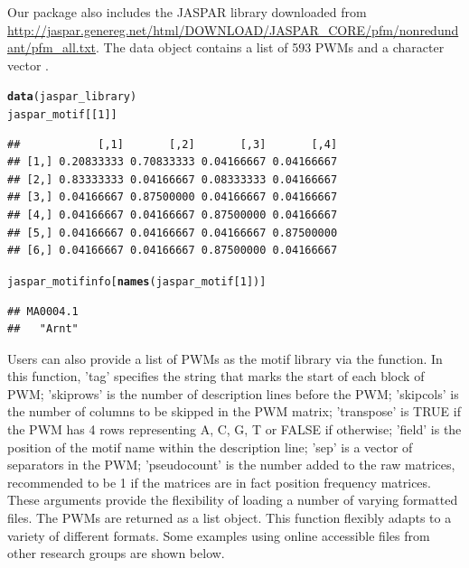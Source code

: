 \documentclass[a4paper,10pt]{article}\usepackage[]{graphicx}\usepackage[]{color}
\makeatletter
\newcommand{\hlnum}[1]{\textcolor[rgb]{0.686,0.059,0.569}{#1}}%
\newcommand{\hlstd}[1]{\textcolor[rgb]{0.345,0.345,0.345}{#1}}%
\newcommand{\hlkwd}[1]{\textcolor[rgb]{0.737,0.353,0.396}{\textbf{#1}}}%
\newenvironment{kframe}{%
 \def\at@end@of@kframe{}%
 \ifinner\ifhmode%
  \def\at@end@of@kframe{\end{minipage}}%
  \begin{minipage}{\columnwidth}%
 \fi\fi%
 \def\FrameCommand##1{\hskip\@totalleftmargin \hskip-\fboxsep
 \colorbox{shadecolor}{##1}\hskip-\fboxsep
     \hskip-\linewidth \hskip-\@totalleftmargin \hskip\columnwidth}%
 \MakeFramed {\advance\hsize-\width
   \@totalleftmargin\z@ \linewidth\hsize
   \@setminipage}}%
 {\par\unskip\endMakeFramed%
 \at@end@of@kframe}
\newenvironment{knitrout}{}{} %
\makeatother
\begin{document}
Our package also includes the JASPAR library downloaded from \url{http://jaspar.genereg.net/html/DOWNLOAD/JASPAR_CORE/pfm/nonredundant/pfm_all.txt}. The data object  contains a list of 593 PWMs  and a character vector .

\begin{knitrout}
\color{fgcolor}\begin{kframe}
\begin{alltt}
\hlkwd{data}\hlstd{(jaspar_library)}
\hlstd{jaspar_motif[[}\hlnum{1}\hlstd{]]}
\end{alltt}
\begin{verbatim}
##            [,1]       [,2]       [,3]       [,4]
## [1,] 0.20833333 0.70833333 0.04166667 0.04166667
## [2,] 0.83333333 0.04166667 0.08333333 0.04166667
## [3,] 0.04166667 0.87500000 0.04166667 0.04166667
## [4,] 0.04166667 0.04166667 0.87500000 0.04166667
## [5,] 0.04166667 0.04166667 0.04166667 0.87500000
## [6,] 0.04166667 0.04166667 0.87500000 0.04166667
\end{verbatim}
\begin{alltt}
\hlstd{jaspar_motifinfo[}\hlkwd{names}\hlstd{(jaspar_motif[}\hlnum{1}\hlstd{])]}
\end{alltt}
\begin{verbatim}
## MA0004.1 
##   "Arnt"
\end{verbatim}
\end{kframe}
\end{knitrout}


Users can also provide a list of PWMs as the motif library via the  function. In this function, 'tag' specifies the string that marks the start of each block of PWM; 'skiprows' is the number of description lines before the PWM; 'skipcols' is the number of columns to be skipped in the PWM matrix; 'transpose' is TRUE if the PWM has 4 rows representing A, C, G, T or FALSE if otherwise; 'field' is the position of the motif name within the description line; 'sep' is a vector of separators in the PWM; 'pseudocount' is the number added to the raw matrices, recommended to be 1 if the matrices are in fact position frequency matrices. These arguments provide the flexibility of loading a number of varying formatted files. The PWMs are returned as a list object. This function flexibly adapts to a variety of different formats. Some examples using online accessible files from other research groups are shown below.
\end{document}
